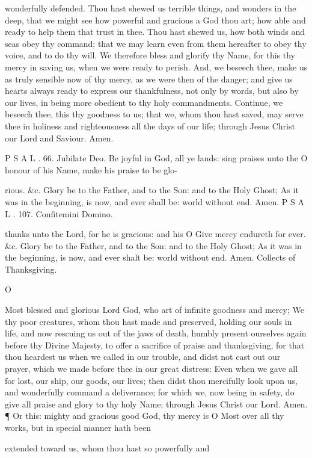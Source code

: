 wonderfully defended. Thou hast shewed us terrible things, and wonders in the deep, that we might see how powerful and gracious a God thou art; how able and ready to help them that trust in thee. Thou hast shewed us, how both winds and seas obey thy command; that we may learn even from them hereafter to obey thy voice, and to do thy will. We therefore bless and glorify thy Name, for this thy mercy in saving us, when we were ready to perish. And, we beseech thee, make us as truly sensible now of thy mercy, as we were then of the danger; and give us hearts always ready to express our thankfulness, not only by words, but also by our lives, in being more obedient to thy holy commandments. Continue, we beseech thee, this thy goodness to us; that we, whom thou hast saved, may serve thee in holiness and righteousness all the days of our life; through Jesus Christ our Lord and Saviour. Amen.

P S A L . 66. Jubilate Deo. Be joyful in God, all ye lands: sing praises unto the O honour of his Name, make his praise to be glo-

rious. \&c. Glory be to the Father, and to the Son: and to the Holy Ghost; As it was in the beginning, is now, and ever shall be: world without end. Amen. P S A L . 107. Confitemini Domino.

thanks unto the Lord, for he is gracious: and his O Give mercy endureth for ever. \&c. Glory be to the Father, and to the Son: and to the Holy Ghost; As it was in the beginning, is now, and ever shalt be: world without end. Amen. Collects of Thanksgiving.

O

Most blessed and glorious Lord God, who art of infinite goodness and mercy; We thy poor creatures, whom thou hast made and preserved, holding our souls in life, and now rescuing us out of the jaws of death, humbly present ourselves again before thy Divine Majesty, to offer a sacrifice of praise and thanksgiving, for that thou heardest us when we called in our trouble, and didst not cast out our prayer, which we made before thee in our great distress: Even when we gave all for lost, our ship, our goods, our lives; then didst thou mercifully look upon us, and wonderfully command a deliverance; for which we, now being in safety, do give all praise and glory to thy holy Name; through Jesus Christ our Lord. Amen. ¶ Or this: mighty and gracious good God, thy mercy is O Most over all thy works, but in special manner hath been

extended toward us, whom thou hast so powerfully and

